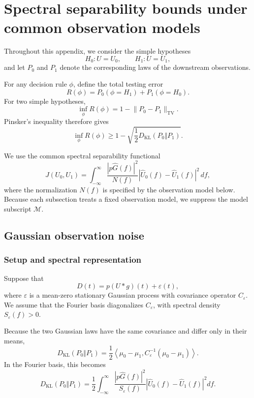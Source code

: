 \renewcommand{\thesection}{S\arabic{section}}
\setcounter{section}{1}
\section{Spectral separability bounds under common observation models}
\label{sec:Appendix_S2}

Throughout this appendix, we consider the simple hypotheses
\[
H_0:U=U_0,
\qquad
H_1:U=U_1,
\]
and let \(P_0\) and \(P_1\) denote the corresponding laws of the downstream observations.

For any decision rule \(\phi\), define the total testing error
\[
R(\phi)
=
P_0(\phi=H_1)
+
P_1(\phi=H_0).
\]
For two simple hypotheses,
\[
\inf_{\phi}R(\phi)
=
1-\lVert P_0-P_1\rVert_{\mathrm{TV}}.
\]
Pinsker's inequality therefore gives
\begin{equation}
\label{eq:S2-general-Pinsker}
\inf_{\phi}R(\phi)
\ge
1-
\sqrt{
\frac{1}{2}
D_{\mathrm{KL}}(P_0\Vert P_1)
}.
\end{equation}

We use the common spectral separability functional
\begin{equation}
\label{eq:S2-common-J}
J(U_0,U_1)
=
\int_{-\infty}^{\infty}
\frac{
|p\widehat G(f)|^2
}{
N(f)
}
\left|
\widehat U_0(f)-\widehat U_1(f)
\right|^2
\,df,
\end{equation}
where the normalization \(N(f)\) is specified by the observation
model below. Because each subsection treats a fixed observation model, we suppress the model subscript $\mathcal M$. 


\subsection{Gaussian observation noise}

\subsubsection{Setup and spectral representation}
Suppose that
\[
D(t)=p(U*g)(t)+\varepsilon(t),
\]
where \(\varepsilon\) is a mean-zero stationary Gaussian process with
covariance operator \(C_\varepsilon\). We assume that the Fourier
basis diagonalizes \(C_\varepsilon\), with spectral density
\(S_\varepsilon(f)>0\).

Because the two Gaussian laws have the same covariance and differ
only in their means,
\[
D_{\mathrm{KL}}(P_0\Vert P_1)
=
\frac12
\left\langle
\mu_0-\mu_1,
C_\varepsilon^{-1}(\mu_0-\mu_1)
\right\rangle.
\]
In the Fourier basis, this becomes
\[
D_{\mathrm{KL}}(P_0\Vert P_1)
=
\frac12
\int_{-\infty}^{\infty}
\frac{|p\widehat G(f)|^2}
{S_\varepsilon(f)}
\left|
\widehat U_0(f)-\widehat U_1(f)
\right|^2df.
\]


